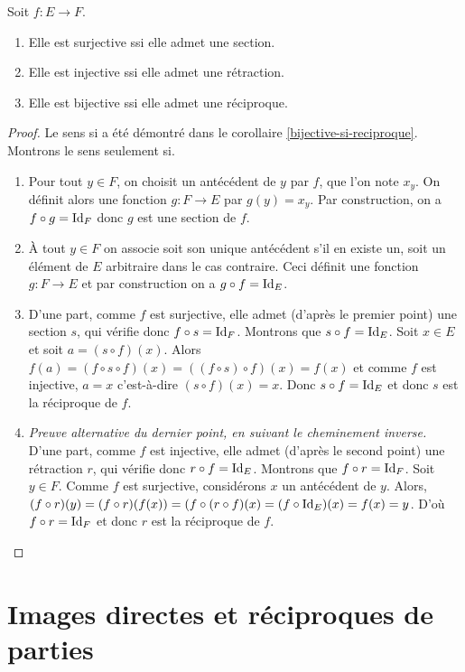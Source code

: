 \begin{proposition}
\label{bijective_ssi_reciproque}
Soit $f : E\to F$.
\begin{enumerate}
\item Elle est surjective ssi elle admet une section.
\item Elle est injective ssi elle admet une rétraction.
\item Elle est bijective ssi elle admet une réciproque.
\end{enumerate}
\end{proposition}
\begin{proof}
Le sens \og si\fg{} a été démontré dans le corollaire \ref{bijective-si-reciproque}. Montrons le sens \og seulement si\fg.
\begin{enumerate}
\item  Pour tout $y\in F$, on choisit un antécédent de $y$ par $f$, que l'on note $x_y$. On définit alors une fonction $g : F\to E$ par $g(y)=x_y$. Par construction, on a $f\circ g = \operatorname{Id}_F$ donc $g$ est une section de $f$.
\item À tout $y\in F$ on associe soit son unique antécédent s'il en existe un, soit un élément de $E$ arbitraire dans le cas contraire. Ceci définit une fonction $g : F\to E$ et par construction on a $g\circ f=\operatorname{Id}_E$.
\item D'une part, comme $f$ est surjective, elle admet (d'après le premier point) une section $s$, qui vérifie donc $f\circ s = \operatorname{Id}_F$. Montrons  que $s\circ f = \operatorname{Id}_E$. Soit $x\in E$ et soit $a = (s\circ f)(x)$. Alors $f(a) = (f\circ s \circ f) (x) = ((f\circ s)\circ f)(x) = f(x)$ et comme $f$ est injective, $a=x$ c'est-à-dire $(s\circ f)(x) = x$. Donc $s\circ f=\operatorname{Id}_E$ et donc $s$ est la réciproque de $f$.
\item \emph{Preuve alternative du dernier point, en suivant le cheminement inverse.} D'une part, comme $f$ est injective, elle admet (d'après le second point) une rétraction $r$, qui vérifie donc $r\circ f=\operatorname{Id}_E$. Montrons  que $f\circ r = \operatorname{Id}_F$. Soit $y\in F$. Comme $f$ est surjective, considérons $x$ un antécédent de $y$. Alors, $(f\circ r)(y) = (f\circ r)(f(x)) =(f\circ (r \circ f)(x) = (f\circ \operatorname{Id}_E)(x) = f(x) = y$. D'où $f\circ r = \operatorname{Id}_F$ et donc $r$ est la réciproque de $f$.
\end{enumerate}
\end{proof}



\section{Images directes et réciproques de parties}

